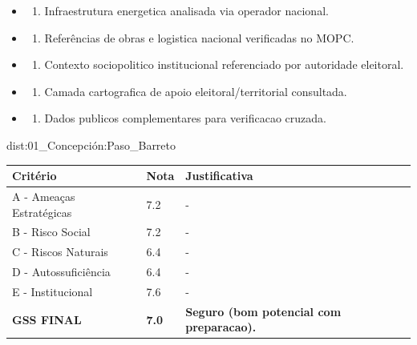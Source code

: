 {\begin{itemize}
\item
  \begin{enumerate}
  \def\labelenumi{\arabic{enumi})}
  \setcounter{enumi}{7}
  \tightlist
  \item
    Infraestrutura energetica analisada via operador nacional.
  \end{enumerate}
\item
  \begin{enumerate}
  \def\labelenumi{\arabic{enumi})}
  \setcounter{enumi}{8}
  \tightlist
  \item
    Referências de obras e logistica nacional verificadas no MOPC.
  \end{enumerate}
\item
  \begin{enumerate}
  \def\labelenumi{\arabic{enumi})}
  \setcounter{enumi}{9}
  \tightlist
  \item
    Contexto sociopolitico institucional referenciado por autoridade
    eleitoral.
  \end{enumerate}
\item
  \begin{enumerate}
  \def\labelenumi{\arabic{enumi})}
  \setcounter{enumi}{10}
  \tightlist
  \item
    Camada cartografica de apoio eleitoral/\allowbreak \allowbreak territorial consultada.
  \end{enumerate}
\item
  \begin{enumerate}
  \def\labelenumi{\arabic{enumi})}
  \setcounter{enumi}{11}
  \tightlist
  \item
    Dados publicos complementares para verificacao cruzada.
  \end{enumerate}
\end{itemize}}{dist:01_Concepción:Paso_Barreto}
\begin{table}[ht!]
\small \begin{tabular}{p{3.0cm}p{0.8cm}p{6.0cm}} \toprule
\textbf{Critério} & \textbf{Nota} & \textbf{Justificativa} \\ \midrule
A - Ameaças Estratégicas & 7.2 & - \\
B - Risco Social & 7.2 & - \\
C - Riscos Naturais & 6.4 & - \\
D - Autossuficiência & 6.4 & - \\
E - Institucional & 7.6 & - \\
\midrule \textbf{GSS FINAL} & \textbf{7.0} & \textbf{Seguro (bom potencial com preparacao).} \\ \bottomrule \end{tabular}
\end{table}
